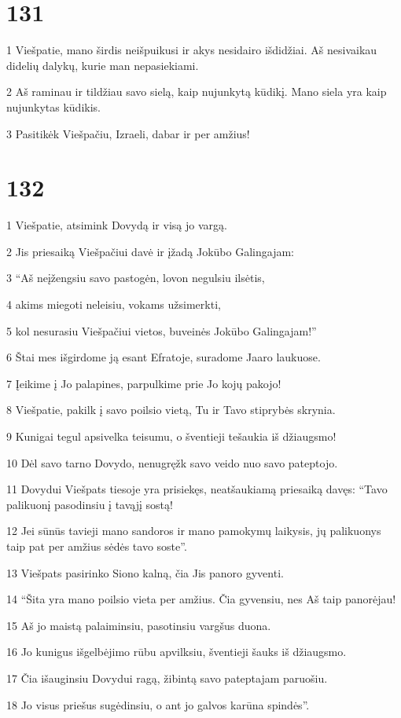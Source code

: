 \chapter{131}


\par 1 Viešpatie, mano širdis neišpuikusi ir akys nesidairo išdidžiai. Aš nesivaikau didelių dalykų, kurie man nepasiekiami. 
\par 2 Aš raminau ir tildžiau savo sielą, kaip nujunkytą kūdikį. Mano siela yra kaip nujunkytas kūdikis. 
\par 3 Pasitikėk Viešpačiu, Izraeli, dabar ir per amžius!


\chapter{132}


\par 1 Viešpatie, atsimink Dovydą ir visą jo vargą. 
\par 2 Jis priesaiką Viešpačiui davė ir įžadą Jokūbo Galingajam: 
\par 3 “Aš neįžengsiu savo pastogėn, lovon negulsiu ilsėtis, 
\par 4 akims miegoti neleisiu, vokams užsimerkti, 
\par 5 kol nesurasiu Viešpačiui vietos, buveinės Jokūbo Galingajam!” 
\par 6 Štai mes išgirdome ją esant Efratoje, suradome Jaaro laukuose. 
\par 7 Įeikime į Jo palapines, parpulkime prie Jo kojų pakojo! 
\par 8 Viešpatie, pakilk į savo poilsio vietą, Tu ir Tavo stiprybės skrynia. 
\par 9 Kunigai tegul apsivelka teisumu, o šventieji tešaukia iš džiaugsmo! 
\par 10 Dėl savo tarno Dovydo, nenugręžk savo veido nuo savo pateptojo. 
\par 11 Dovydui Viešpats tiesoje yra prisiekęs, neatšaukiamą priesaiką davęs: “Tavo palikuonį pasodinsiu į tavąjį sostą! 
\par 12 Jei sūnūs tavieji mano sandoros ir mano pamokymų laikysis, jų palikuonys taip pat per amžius sėdės tavo soste”. 
\par 13 Viešpats pasirinko Siono kalną, čia Jis panoro gyventi. 
\par 14 “Šita yra mano poilsio vieta per amžius. Čia gyvensiu, nes Aš taip panorėjau! 
\par 15 Aš jo maistą palaiminsiu, pasotinsiu vargšus duona. 
\par 16 Jo kunigus išgelbėjimo rūbu apvilksiu, šventieji šauks iš džiaugsmo. 
\par 17 Čia išauginsiu Dovydui ragą, žibintą savo pateptajam paruošiu. 
\par 18 Jo visus priešus sugėdinsiu, o ant jo galvos karūna spindės”.


